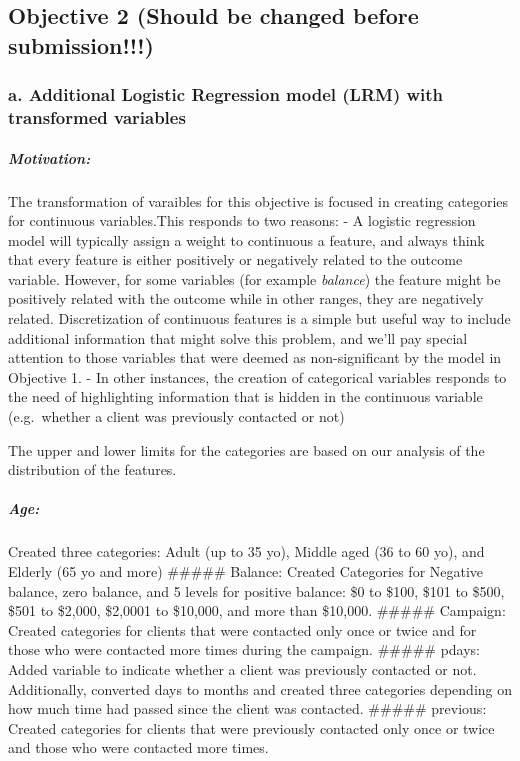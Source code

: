 \documentclass[]{article}
\let\oldsubparagraph\subparagraph
\renewcommand{\subparagraph}[1]{\oldsubparagraph{#1}\mbox{}}
\begin{document}
\subsection{Objective 2 (Should be changed before
submission!!!)}\label{objective-2-should-be-changed-before-submission}

\subsubsection{a. Additional Logistic Regression model (LRM) with
transformed
variables}\label{a.-additional-logistic-regression-model-lrm-with-transformed-variables}

\subparagraph{Motivation:}\label{motivation}

The transformation of varaibles for this objective is focused in
creating categories for continuous variables.This responds to two
reasons: - A logistic regression model will typically assign a weight to
continuous a feature, and always think that every feature is either
positively or negatively related to the outcome variable. However, for
some variables (for example \emph{balance}) the feature might be
positively related with the outcome while in other ranges, they are
negatively related. Discretization of continuous features is a simple
but useful way to include additional information that might solve this
problem, and we'll pay special attention to those variables that were
deemed as non-significant by the model in Objective 1. - In other
instances, the creation of categorical variables responds to the need of
highlighting information that is hidden in the continuous variable
(e.g.~whether a client was previously contacted or not)

The upper and lower limits for the categories are based on our analysis
of the distribution of the features.

\subparagraph{Age:}\label{age}

Created three categories: Adult (up to 35 yo), Middle aged (36 to 60
yo), and Elderly (65 yo and more) \#\#\#\#\# Balance: Created Categories
for Negative balance, zero balance, and 5 levels for positive balance:
\$0 to \$100, \$101 to \$500, \$501 to \$2,000, \$2,0001 to \$10,000,
and more than \$10,000. \#\#\#\#\# Campaign: Created categories for
clients that were contacted only once or twice and for those who were
contacted more times during the campaign. \#\#\#\#\# pdays: Added
variable to indicate whether a client was previously contacted or not.
Additionally, converted days to months and created three categories
depending on how much time had passed since the client was contacted.
\#\#\#\#\# previous: Created categories for clients that were previously
contacted only once or twice and those who were contacted more times.
\end{document}
